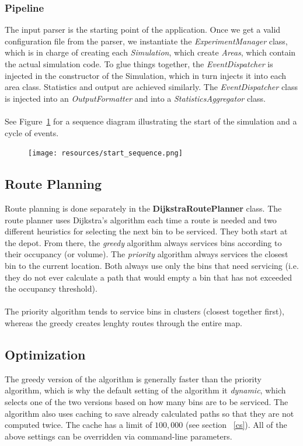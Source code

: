 \documentclass{article}
\begin{document}
		\subsubsection{Pipeline}
		The input parser is the starting point of the application. Once we get a valid configuration file from the parser, we instantiate the
		\textit{ExperimentManager} class, which is in charge of creating each \textit{Simulation}, which create \textit{Areas}, which contain the actual
		simulation code. To glue things together, the \textit{EventDispatcher} is injected in the constructor of the Simulation, which in turn 
		injects it into each area class. Statistics and output are achieved similarly. The \textit{EventDispatcher} class is injected into an
		\textit{OutputFormatter} and into a \textit{StatisticsAggregator} class.
			\\
			\\
			See Figure~\ref{fig:fig2} for a sequence diagram illustrating the start of the simulation and a cycle of events.

		\begin{figure}[H]
		\centering
			\texttt{[image: resources/start\_sequence.png]}
			\label{fig:fig2} 
		\end{figure}

	\subsection{Route Planning}
	Route planning is done separately in the \textbf{DijkstraRoutePlanner} class. The route planner uses Dijkstra's algorithm each time
	a route is needed and two different heuristics for selecting the next bin to be serviced. They both start at the depot. From there, the \textit{greedy} algorithm always services
	bins according to their occupancy (or volume). The \textit{priority} algorithm always services the closest bin to the current location. Both always use only the bins
	that need servicing (i.e. they do not ever calculate a path that would empty a bin that has not exceeded the occupancy threshold).
	\\
	\\
	The priority algorithm tends to service bins in clusters (closest together first), whereas the greedy creates lenghty routes through the entire
	map.

	\subsection{Optimization} \label{optimization}
		The greedy version of the algorithm is generally faster than the priority algorithm, which is why the default setting of the algorithm it \textit{dynamic}, which
		selects one of the two versions based on how many bins are to be serviced. The algorithm also uses caching to save already calculated paths
		so that they are not computed twice. The cache has a limit of $100,000$ (see section ~\ref{cs}). All of the above settings can be overridden via command-line parameters.
		
\end{document}
